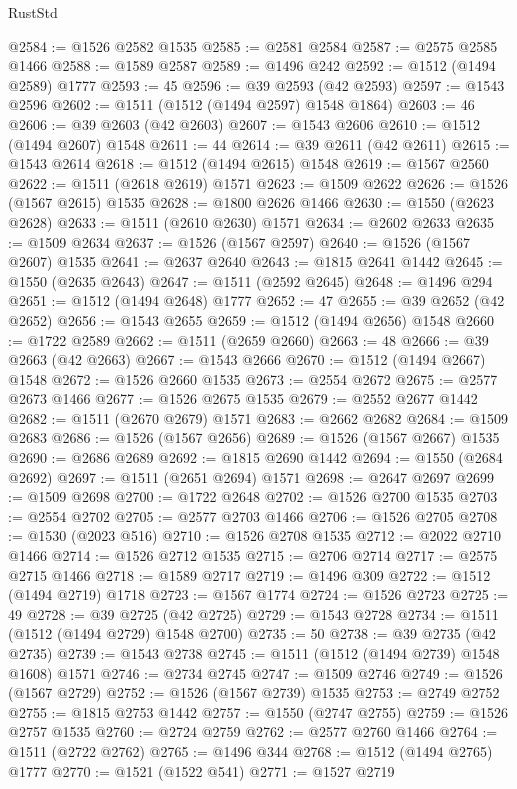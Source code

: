 \begin{lexlean}{RustStd}
\begin{coremodule}
{{@2584 := @1526 @2582 @1535
@2585 := @2581 @2584
@2587 := @2575 @2585 @1466
@2588 := @1589 @2587
@2589 := @1496 @242
@2592 := @1512 (@1494 @2589) @1777
@2593 := 45
@2596 := @39 @2593 (@42 @2593)
@2597 := @1543 @2596
@2602 := @1511 (@1512 (@1494 @2597) @1548 @1864)
@2603 := 46
@2606 := @39 @2603 (@42 @2603)
@2607 := @1543 @2606
@2610 := @1512 (@1494 @2607) @1548
@2611 := 44
@2614 := @39 @2611 (@42 @2611)
@2615 := @1543 @2614
@2618 := @1512 (@1494 @2615) @1548
@2619 := @1567 @2560
@2622 := @1511 (@2618 @2619) @1571
@2623 := @1509 @2622
@2626 := @1526 (@1567 @2615) @1535
@2628 := @1800 @2626 @1466
@2630 := @1550 (@2623 @2628)
@2633 := @1511 (@2610 @2630) @1571
@2634 := @2602 @2633
@2635 := @1509 @2634
@2637 := @1526 (@1567 @2597)
@2640 := @1526 (@1567 @2607) @1535
@2641 := @2637 @2640
@2643 := @1815 @2641 @1442
@2645 := @1550 (@2635 @2643)
@2647 := @1511 (@2592 @2645)
@2648 := @1496 @294
@2651 := @1512 (@1494 @2648) @1777
@2652 := 47
@2655 := @39 @2652 (@42 @2652)
@2656 := @1543 @2655
@2659 := @1512 (@1494 @2656) @1548
@2660 := @1722 @2589
@2662 := @1511 (@2659 @2660)
@2663 := 48
@2666 := @39 @2663 (@42 @2663)
@2667 := @1543 @2666
@2670 := @1512 (@1494 @2667) @1548
@2672 := @1526 @2660 @1535
@2673 := @2554 @2672
@2675 := @2577 @2673 @1466
@2677 := @1526 @2675 @1535
@2679 := @2552 @2677 @1442
@2682 := @1511 (@2670 @2679) @1571
@2683 := @2662 @2682
@2684 := @1509 @2683
@2686 := @1526 (@1567 @2656)
@2689 := @1526 (@1567 @2667) @1535
@2690 := @2686 @2689
@2692 := @1815 @2690 @1442
@2694 := @1550 (@2684 @2692)
@2697 := @1511 (@2651 @2694) @1571
@2698 := @2647 @2697
@2699 := @1509 @2698
@2700 := @1722 @2648
@2702 := @1526 @2700 @1535
@2703 := @2554 @2702
@2705 := @2577 @2703 @1466
@2706 := @1526 @2705
@2708 := @1530 (@2023 @516)
@2710 := @1526 @2708 @1535
@2712 := @2022 @2710 @1466
@2714 := @1526 @2712 @1535
@2715 := @2706 @2714
@2717 := @2575 @2715 @1466
@2718 := @1589 @2717
@2719 := @1496 @309
@2722 := @1512 (@1494 @2719) @1718
@2723 := @1567 @1774
@2724 := @1526 @2723
@2725 := 49
@2728 := @39 @2725 (@42 @2725)
@2729 := @1543 @2728
@2734 := @1511 (@1512 (@1494 @2729) @1548 @2700)
@2735 := 50
@2738 := @39 @2735 (@42 @2735)
@2739 := @1543 @2738
@2745 := @1511 (@1512 (@1494 @2739) @1548 @1608) @1571
@2746 := @2734 @2745
@2747 := @1509 @2746
@2749 := @1526 (@1567 @2729)
@2752 := @1526 (@1567 @2739) @1535
@2753 := @2749 @2752
@2755 := @1815 @2753 @1442
@2757 := @1550 (@2747 @2755)
@2759 := @1526 @2757 @1535
@2760 := @2724 @2759
@2762 := @2577 @2760 @1466
@2764 := @1511 (@2722 @2762)
@2765 := @1496 @344
@2768 := @1512 (@1494 @2765) @1777
@2770 := @1521 (@1522 @541)
@2771 := @1527 @2719
}}
\end{coremodule}
\end{lexlean}
